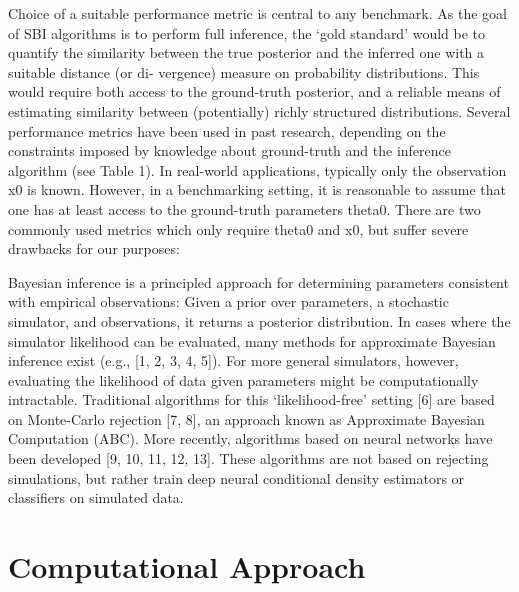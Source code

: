 Choice of a suitable performance metric is central to any benchmark. As the goal of SBI algorithms is to perform full inference, the ‘gold standard’ would be to quantify the similarity between the true posterior and the inferred one with a suitable distance (or di- vergence) measure on probability distributions. This would require both access to the ground-truth posterior, and a reliable means of estimating similarity between (potentially) richly structured distributions. Several performance metrics have been used in past research, depending on the constraints imposed by knowledge about ground-truth and the inference algorithm (see Table 1). In real-world applications, typically only the observation x0 is known. However, in a benchmarking setting, it is reasonable to assume that one has at least access to the ground-truth parameters theta0. There are two commonly used metrics which only require theta0 and
x0, but suffer severe drawbacks for our purposes:


Bayesian inference is a principled approach for determining parameters consistent with empirical observations: Given a prior over parameters, a stochastic simulator, and observations, it returns a posterior distribution. In cases where the simulator likelihood can be evaluated, many methods for approximate Bayesian
inference exist (e.g., [1, 2, 3, 4, 5]). For more general simulators, however, evaluating the likelihood of data
given parameters might be computationally intractable. Traditional algorithms for this ‘likelihood-free’
setting [6] are based on Monte-Carlo rejection [7, 8], an approach known as Approximate Bayesian Computation (ABC). More recently, algorithms based on neural networks have been developed [9, 10, 11, 12, 13].
These algorithms are not based on rejecting simulations, but rather train deep neural conditional density estimators or classifiers on simulated data. 




\chapter{Computational Approach}\label{chap:comp_approach}

